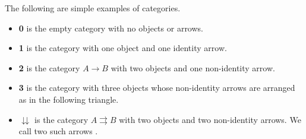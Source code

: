 \documentclass[11pt,letterpaper]{jacky}
\begin{document}
\begin{ex}
    The following are simple examples of categories.
    \begin{itemize}
        \item \textbf{0} is the empty category with no objects or arrows.
        \item \textbf{1} is the category with one object and one identity
            arrow.
        \item \textbf{2} is the category $A\rightarrow B$ with two objects and
            one non-identity arrow.
        \item \textbf{3} is the category with three objects whose non-identity
            arrows are arranged as in the following triangle.
            \begin{center}
            \end{center}
        \item $\downdownarrows$ is the category $A\rightrightarrows B$ with two
            objects and two non-identity arrows. We call two such arrows
            .
    \end{itemize}
\end{ex}
\end{document}
